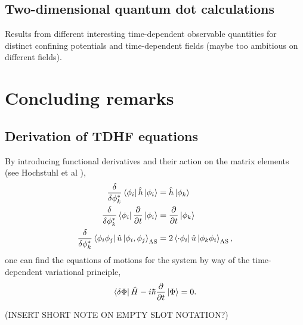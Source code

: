 \documentclass[aip,jcp,reprint,floatfix]{revtex4-1}
\begin{document}
    \subsection{Two-dimensional quantum dot calculations}
        Results from different interesting time-dependent observable quantities for distinct confining potentials and time-dependent fields (maybe too ambitious on different fields).

\section{Concluding remarks}
\begin{appendices}
\section{Derivation of TDHF equations} \label{TDHF_Derivation}
By introducing functional derivatives and their action on the matrix elements (see Hochstuhl et al \cite{Hochstuhl2014}),
\begin{align}
    \frac{\delta}{\delta \phi^*_k}\bra{\phi_i}\hat{h}\ket{\phi_i} &= \hat{h}\ket{\phi_k} \\
    \frac{\delta}{\delta \phi^*_k}\bra{\phi_i}\frac{\partial}{\partial t} \ket{\phi_i} 
    &= \frac{\partial}{\partial t}\ket{\phi_k} \\
    \frac{\delta}{\delta \phi^*_k}\bra{\phi_i \phi_j} \hat{u} \ket{\phi_i, \phi_j}_{\text{AS}}
    &= 2\bra{\cdot \phi_i} \hat{u} \ket{\phi_k \phi_i}_{\text{AS}},
\end{align}
one can find the equations of motions for the system by way of the time-dependent variational principle,
\begin{equation}
    \label{td_variational_principle}
    \bra{\delta \Phi} \hat{H} - i\hbar \frac{\partial}{\partial t} \ket{\Phi} = 0.
\end{equation}

(INSERT SHORT NOTE ON EMPTY SLOT NOTATION?)


\end{appendices}
\end{document}
